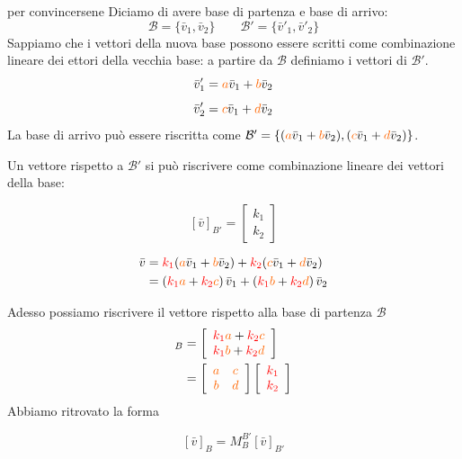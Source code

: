 \documentclass[x11names]{article}
\begin{document}
\begin{es}{per convincersene}
Diciamo di avere base di partenza e base di arrivo:
\[
\mathscr{B} = \{\bar{v}_{1},\bar{v}_{2}\} \qquad \mathscr{B}' = \{\bar{v}'_{1},\bar{v}'_{2}\}
\]
Sappiamo che i vettori della nuova base possono essere scritti come combinazione lineare dei ettori della vecchia base: a partire da $\mathcal{B}$ definiamo i vettori di $\mathcal{B}'$.
\[
\bar{v}'_{1} = \textcolor{myorange}{a}\bar{v}_{1} + \textcolor{myorange}{b}\bar{v}_{2}
\]
\[
\bar{v}'_{2} = \textcolor{myorange}{c}\bar{v}_{1} + \textcolor{myorange}{d}\bar{v}_{2}
\]
La base di arrivo può essere riscritta come $ \mathcal{B}' = \left\{(\textcolor{myorange}{a}\bar{v}_{1} + \textcolor{myorange}{b}\bar{v}_{2}),(\textcolor{myorange}{c}\bar{v}_{1} + \textcolor{myorange}{d}\bar{v}_{2}) \right\}$.

Un vettore rispetto a $\mathcal{B}'$ si può riscrivere come combinazione lineare dei vettori della base:

\[
\left[\bar{v}\right]_{B'}  = \left[\begin{array}{c}
		k_{1} \\ k_{2}
\end{array} \right]
\]

\begin{align*}
	\bar{v} &= \textcolor{red}{k_{1}}(\textcolor{myorange}{a}\bar{v}_{1} + \textcolor{myorange}{b}\bar{v}_{2}) + \textcolor{red}{k_{2}}(\textcolor{myorange}{c}\bar{v}_{1} + \textcolor{myorange}{d}\bar{v}_{2}) \\
	&= \left(\textcolor{red}{k_{1}}\textcolor{myorange}{a} + \textcolor{red}{k_{2}}\textcolor{myorange}{c}\right)\bar{v}_{1} + 
	\left(\textcolor{red}{k_{1}}\textcolor{myorange}{b} + \textcolor{red}{k_{2}}\textcolor{myorange}{d} \right)\bar{v}_{2} 
\end{align*}
\end{es}
\begin{es}
	
Adesso possiamo riscrivere il vettore rispetto alla base di partenza $\mathcal{B}$
\begin{align*}
[\bar{v}]_{B} &= \left[\begin{array}{c}
	\textcolor{red}{k_{1}}\textcolor{myorange}{a} + \textcolor{red}{k_{2}}\textcolor{myorange}{c} \\
	\textcolor{red}{k_{1}}\textcolor{myorange}{b} + \textcolor{red}{k_{2}}\textcolor{myorange}{d}
\end{array}\right] \\
	&=\left[\begin{array}{cc}
		\textcolor{myorange}{a} & \textcolor{myorange}{c} \\
		\textcolor{myorange}{b} &\textcolor{myorange}{d}
	\end{array}\right]
	\left[
	\begin{array}{c}
		\textcolor{red}{k_{1}}\\
		\textcolor{red}{k_{2}}
	\end{array}\right]
\end{align*}
Abbiamo ritrovato la forma

\[
[\bar{v}]_{B} =  M_{B}^{B'} [\bar{v}]_{B'}
\] 

\end{es}
\end{document}
